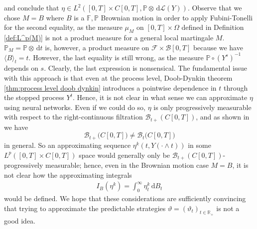 \documentclass[11pt,a4paper,twoside,openany]{report}
\numberwithin{equation}{section}
\newcommand{\diff}{\mathrm{d}}
\theoremstyle{plain} %
\theoremstyle{definition} %
\theoremstyle{remark} %
\let\parencite\authnumparencite
\begin{document}
and conclude that \(\eta\in L^2([0,T]\times C[0,T],\mathbb{P}\otimes\,\diff\mathcal{L}(Y))\). Observe that we chose \(M=B\) where \(B\) is a \(\mathbb{F},\mathbb{P}\) Brownian motion in order to apply Fubini-Tonelli for the second equality, as the measure \(\mu_M\) on \([0,T]\times \Omega\) defined in Definition \ref{def:L^p(M)} is not a product measure for a general local martingale \(M\). \(\mathbb{P}_M=\mathbb{P}\otimes\,\diff t\) is, however, a product measure on \(\mathcal{F}\times \mathcal{B}[0,T]\) because we have \(\langle B\rangle_t=t\). However, the last equality is still wrong, as the measure \(\mathbb{P}\circ (Y^{s})^{-1}\) depends on \(s\). Clearly, the last expression is nonsensical. The fundamental issue with this approach is that even at the process level, Doob-Dynkin theorem \ref{thm:process level doob dynkin} introduces a pointwise dependence in \(t\) through the stopped process \(Y^t\). 
Hence, it is not clear in what sense we can approximate \(\eta\) using neural networks. Even if we could do so, \(\eta\) is only progressively measurable with respect to the right-continuous filtration \(\mathcal{B}_{t+}(C[0,T])\), and as shown in \parencite[Problem.~7.1]{KaratzasShreve1991Brownian} we have 
\begin{equation*}
    \mathcal{B}_{t+}\big(C[0,T]\big)\neq \mathcal{B}_{t}\big(C[0,T]\big)
\end{equation*}
in general. So an approximating sequence \(\eta^k(t,Y(\cdot\wedge t))\) in some \(L^p([0,T]\times C[0,T])\) space would generally only be \(\mathcal{B}_{t+}(C[0,T])\)-progressively measurable; hence, even in the Brownian motion case \(M=B\), it is not clear how the approximating integrals 
\begin{align*}
    I_{B}(\eta^k)=\int_0^{\infty}\eta^k_t\,\diff B_t
\end{align*}
would be defined. We hope that these considerations are  sufficiently convincing that trying to approximate the predictable strategies \(\vartheta=(\vartheta_t)_{t\in\mathbb{R}_+}\) is not a good idea. 
\end{document}
